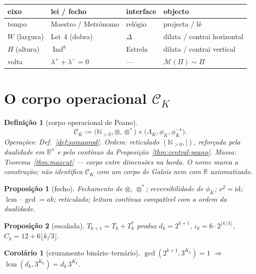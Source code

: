 \documentclass[11pt,a4paper]{article}
\newtheorem{definicao}{Definição}
\newtheorem{proposicao}{Proposição}
\newtheorem{corolario}{Corolário}
\begin{document}
\begin{center}\small
\begin{tabular}{@{}llll@{}}
eixo & lei / fecho & interface & objecto \\
\hline
tempo & Maestro / Metrónomo & relógio & projecta / lê \\
$W$ (largura) & Lei~4 (dobra) & $\Delta$ & dilata / contrai horizontal \\
$H$ (altura) & $\operatorname{Ind}^{8}$ & Estrela & dilata / contrai vertical \\
volta & $\lambda^{+}+\lambda^{-}=0$ & --- & $\mathcal{M}(\Pi)\sim\Pi$ \\
\end{tabular}
\end{center}

\section{O corpo operacional $\mathcal{C}_K$}

\begin{definicao}[corpo operacional de Peano]\label{def:corpo}
\[
\mathcal{C}_K
:=
\bigl(\mathbb{N}_{>0},\otimes,\otimes^{*}\bigr)
\times
\bigl(\Lambda_K,\phi_K,\phi_K^{-1}\bigr).
\]
Operações: Def.~\ref{def:somaprod}. Ordem: reticulado
$(\mathbb{N}_{>0},\mid)$, reforçada pela dualidade em $\mathbb{R}^{n}$
e pelo contínuo da Proposição~\ref{thm:central-peano}. Massa: Teorema~\ref{thm:maxcut}
--- corpo entre dimensões na borda. O nome marca a construção; não
identifica $\mathcal{C}_K$ com um corpo de Galois nem com $\mathbb{R}$
axiomatizado.
\end{definicao}

\begin{proposicao}[fecho]\label{prop:corpo}
Fechamento de $\otimes$, $\otimes^{*}$; reversibilidade de $\phi_K$;
$\nu^{2}=\mathrm{id}$; $\operatorname{lcm}\cdot\operatorname{gcd}=ab$;
reticulado; leitura contínua compatível com a ordem da dualidade.
\end{proposicao}

\begin{proposicao}[escalada]\label{prop:escalada}
$T_{k+1}=T_k+T_k^{*}$ produz
$d_k=2^{k+1}$,
$\iota_k=6\cdot2^{\lfloor k/3\rfloor}$,
$C_k=12+6\lfloor k/3\rfloor$.
\end{proposicao}

\begin{corolario}[cruzamento binário--ternário]\label{cor:cruza}
$\gcd(2^{k+1},3^{K_k})=1$ $\Rightarrow$
$\operatorname{lcm}(d_k,3^{K_k})=d_k\,3^{K_k}$.
\end{corolario}
\end{document}
